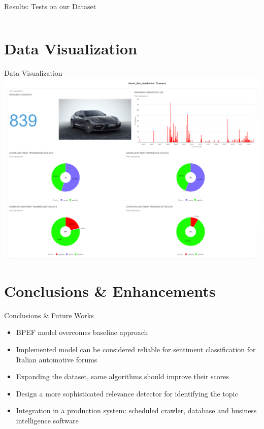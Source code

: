 \documentclass{beamer}
\begin{document}
\begin{frame}{Results: Tests on our Dataset}
{\begin{columns}
				
			\end{columns}
			
		}
		
	\end{frame}







	
	\section{Data Visualization}
	
	\begin{frame}{Data Visualization}
		\centering
		\vspace{-5mm}
		\includegraphics[width=\linewidth]{figures/dataset_data_visualization_2.pdf}

	\end{frame}









	\section{Conclusions \& Enhancements}
	
	\begin{frame}{Conclusions \& Future Works}
		
		\begin{itemize}
			\item BPEF model overcomes baseline approach
			\item Implemented model can be considered reliable for sentiment classification for Italian automotive forums
			\vspace{1cm}
			\item Expanding the dataset, same algorithms should improve their scores
			\item Design a more sophisticated relevance detector for identifying the topic
			\item Integration in a production system: scheduled crawler, database and business intelligence software
		\end{itemize}

	\end{frame}
\end{document}
